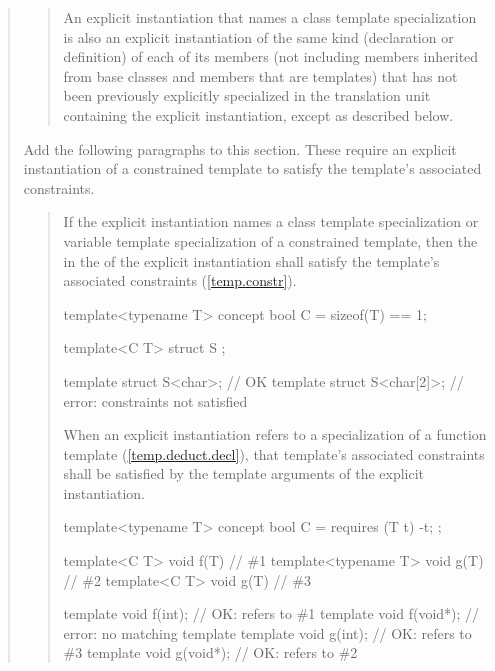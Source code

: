 \begin{quote}
\begin{quote}
\setcounter{Paras}{7}
\pnum
An explicit instantiation that names a class template specialization is 
also an explicit instantiation of the same kind (declaration or 
definition) of each of its members (not including members inherited from 
base classes and members that are templates) that has not been previously 
explicitly specialized in the translation unit containing the explicit 
instantiation,  
except as described below.
\end{quote}

Add the following paragraphs to this section. These require an explicit
instantiation of a constrained template to satisfy the template's
associated constraints.

\begin{quote}
\begin{addedblock}
\setcounter{Paras}{13}
\pnum
If the explicit instantiation names a class template specialization
or variable template specialization of a constrained template, then
the  in the
 of the explicit
instantiation shall satisfy the template's associated constraints
(\ref{temp.constr}).
\enterexample
\begin{codeblock}
template<typename T> concept bool C = sizeof(T) == 1;

template<C T> struct S { };

template struct S<char>;    // OK
template struct S<char[2]>; // error: constraints not satisfied
\end{codeblock}
\exitexample

\pnum
When an explicit instantiation refers to a specialization of a
function template (\ref{temp.deduct.decl}), that 
template's associated constraints shall be satisfied by the template 
arguments of the explicit instantiation.

\enterexample
\begin{codeblock}
template<typename T> concept bool C = requires (T t) { -t; };

template<C T>        void f(T) { } // \#1
template<typename T> void g(T) { } // \#2
template<C T>        void g(T) { } // \#3

template void f(int);   // OK: refers to \#1
template void f(void*); // error: no matching template
template void g(int);   // OK: refers to \#3
template void g(void*); // OK: refers to \#2
\end{codeblock}
\exitexample
\end{addedblock}
\end{quote}



\end{quote}
